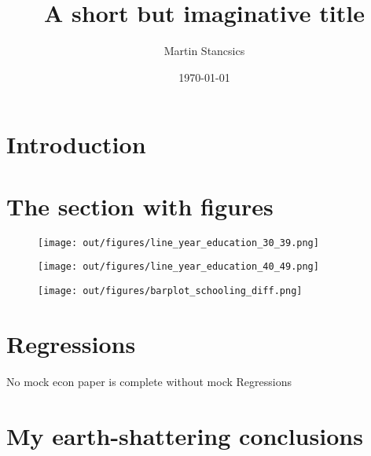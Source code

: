 \documentclass[a4paper]{article}
\author{Martin Stancsics}
\title{A short but imaginative title}
\date{\today}
\begin{document}
\maketitle

\section{Introduction}
\lipsum[1-3]

\section{The section with figures}
\lipsum[5]
\begin{figure}
    \centering
    \texttt{[image: out/figures/line\_year\_education\_30\_39.png]}
\end{figure}
\begin{figure}
    \centering
    \texttt{[image: out/figures/line\_year\_education\_40\_49.png]}
\end{figure}
\lipsum[4]
\begin{figure}
    \centering
    \texttt{[image: out/figures/barplot\_schooling\_diff.png]}
\end{figure}

\section{Regressions}
No mock econ paper is complete without mock Regressions
\begin{landscape}
    
    
\end{landscape}

\section{My earth-shattering conclusions}
\lipsum[8-9]
\end{document}
